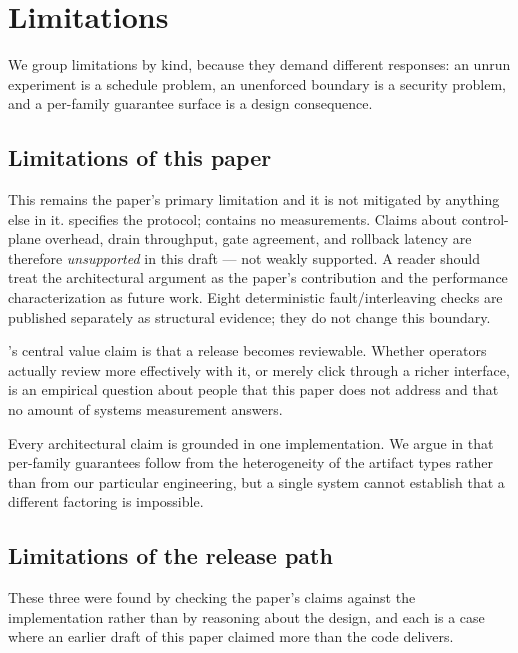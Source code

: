 \section{Limitations}
\label{sec:limitations}

We group limitations by kind, because they demand different responses: an unrun
experiment is a schedule problem, an unenforced boundary is a security problem, and
a per-family guarantee surface is a design consequence.

\subsection{Limitations of this paper}

 This remains the paper's primary
limitation and it is not mitigated by anything else in it. 
specifies the protocol;  contains no measurements. Claims about
control-plane overhead, drain throughput, gate agreement, and rollback latency are
therefore \emph{unsupported} in this draft --- not weakly supported. A reader should
treat the architectural argument as the paper's contribution and the performance
characterization as future work. Eight deterministic fault/interleaving checks are
published separately as structural evidence; they do not change this boundary.

 \sys's central value claim is that a release becomes
reviewable. Whether operators actually review more effectively with it, or merely
click through a richer interface, is an empirical question about people that this
paper does not address and that no amount of systems measurement answers.

 Every architectural claim is grounded in one
implementation. We argue in  that per-family guarantees follow
from the heterogeneity of the artifact types rather than from our particular
engineering, but a single system cannot establish that a different factoring is
impossible.

\subsection{Limitations of the release path}

These three were found by checking the paper's claims against the implementation
rather than by reasoning about the design, and each is a case where an earlier
draft of this paper claimed more than the code delivers.


